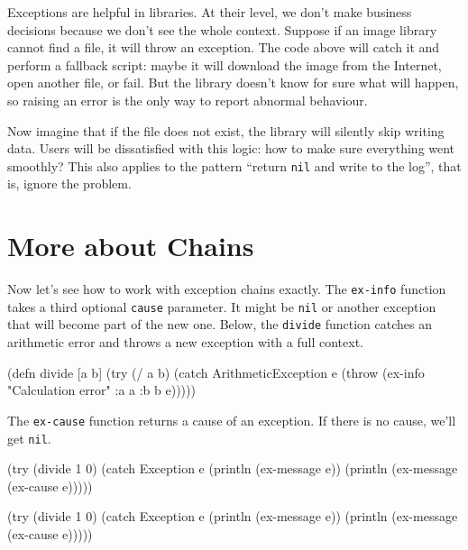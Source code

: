 \fi

Exceptions are helpful in libraries. At their level, we don't make business decisions because we don't see the whole context. Suppose if an image library cannot find a file, it will throw an exception. The code above will catch it and perform a fallback script: maybe it will download the image from the Internet, open another file, or fail. But the library doesn't know for sure what will happen, so raising an error is the only way to report abnormal behaviour.

Now imagine that if the file does not exist, the library will silently skip writing data. Users will be dissatisfied with this logic: how to make sure everything went smoothly? This also applies to the pattern ``return \verb|nil| and write to the log'', that is, ignore the problem.

\section{More about Chains}


Now let's see how to work with exception chains exactly. The \verb|ex-info| function takes a third optional \verb|cause| parameter. It might be \verb|nil| or another exception that will become part of the new one. Below, the \verb|divide| function catches an arithmetic error and throws a new exception with a full context.


\label{re-throw-example}

\begin{clojure}
(defn divide [a b]
  (try
    (/ a b)
    (catch ArithmeticException e
      (throw (ex-info
               "Calculation error"
               {:a a :b b}
               e)))))
\end{clojure}

The \verb|ex-cause| function returns a cause of an exception. If there is no cause, we'll get \verb|nil|.

\ifx\DEVICETYPE\MOBILE

\begin{clojure}
(try
  (divide 1 0)
  (catch Exception e
    (println (ex-message e))
    (println (ex-message
               (ex-cause e)))))
\end{clojure}

\else

\begin{clojure}
(try
  (divide 1 0)
  (catch Exception e
    (println (ex-message e))
    (println (ex-message (ex-cause e)))))
\end{clojure}

